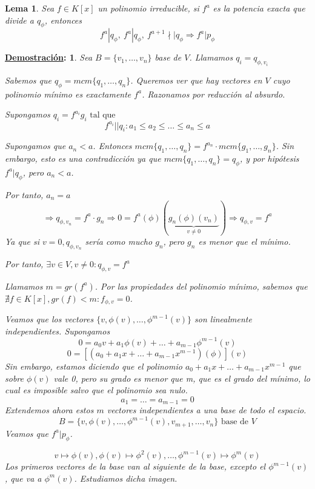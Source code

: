 \documentclass[10pt,a4paper,openright]{book}
\theoremstyle{break}
\newtheorem*{lema}{Lema}
\newtheorem*{demo}{\underline{Demostración}:}
\begin{document}
\begin{lema}
Sea $f \in K[x]$ un polinomio irreducible, si $f^a$ es la potencia exacta que divide a $q_\phi$, entonces
$$f^a | q_\phi, \ f^a | q_\phi, \ f^{a+1} \nmid \mid q_\phi \Rightarrow f^a | p_\phi$$
\end{lema}
\begin{demo}
Sea $B = \{v_1, \ldots, v_n \}$ base de $V$. Llamamos $q_i = q_{\phi, v_i}$

Sabemos que $q_\phi = mcm \{q_1, \ldots, q_n\}$. Queremos ver que hay vectores en $V$ cuyo polinomio mínimo es exactamente $f^a$. Razonamos por reducción al absurdo.

Supongamos $q_i = f^{a_i} g_i \mbox{ tal que }$
$$f^{a_i} || q_i : a_1 \leq a_2 \leq \ldots \leq a_n \leq a$$

Supongamos que $a_n < a$. Entonces $ mcm \{q_1, \ldots, q_n\} = f^{a_n}  \cdot mcm \{g_1, \ldots, g_n\}$. Sin embargo, esto es una contradicción ya que $mcm \{q_1, \ldots, q_n\} = q_\phi$, y por hipótesis $f^a | q_\phi$, pero $a_n < a $.

Por tanto, $a_n = a$
$$\Rightarrow q_{\phi, v_n} = f^a \cdot g_n \Rightarrow 0 = f^a(\phi)(\underbrace{g_n(\phi)(v_n)}_{v \neq 0}) \Rightarrow q_{\phi, v} = f^a $$
Ya que si $v = 0, q_{\phi, v_n}$ sería como mucho $g_n$, pero $g_n$ es menor que el mínimo.

Por tanto, $\exists v \in V, v \neq 0 : q_{\phi, v} = f^a$

Llamamos $m = gr(f^a)$. Por las propiedades del polinomio mínimo, sabemos que $\nexists f \in K[x] , gr(f) < m : f_{\phi, v} = 0$.

Veamos que los vectores $\{v, \phi(v), \ldots, \phi^{m-1}(v)\}$ son linealmente independientes. Supongamos
$$ 0 = a_0 v + a_1 \phi(v) + \ldots + a_{m-1}\phi^{m-1}(v) $$
$$0 = \left[(a_0  + a_1 x + \ldots + a_{m-1}x^{m-1})(\phi)\right](v)$$
Sin embargo, estamos diciendo que el polinomio $a_0  + a_1 x + \ldots + a_{m-1}x^{m-1}$ que sobre $\phi(v)$ vale 0, pero su grado es menor que m, que es el grado del mínimo, lo cual es imposible salvo que el polinomio sea nulo.
$$a_1 = \ldots = a_{m-1} = 0$$
Extendemos ahora estos $m$ vectores independientes a una base de todo el espacio.
$$B = \{ v, \phi(v), \ldots, \phi^{m-1}(v), v_{m+1}, \ldots, v_n \} \mbox{ base de $V$}$$
Veamos que $f^a | p_\phi$.

$$v \mapsto \phi(v) , \phi(v) \mapsto \phi^2(v), \ldots, \phi^{m-1}(v) \mapsto \phi^m(v) $$
Los primeros vectores de la base van al siguiente de la base, excepto el $\phi^{m-1}(v)$, que va a $\phi^m(v)$. Estudiamos dicha imagen.


\end{demo}
\end{document}
